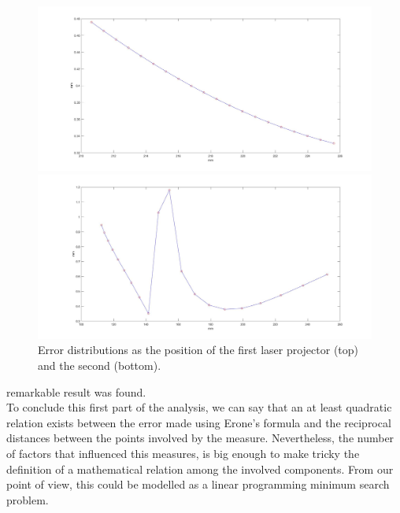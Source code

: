   \begin{figure}[t!]
    \centering
    \begin{minipage}[c]{0.9\textwidth}
      \centering
      \includegraphics[width=\textwidth]{./images/diameter/H1_1.jpg}
    \end{minipage}
    \vfill
    \begin{minipage}[c]{0.9\textwidth}
      \centering
      \includegraphics[width=\textwidth]{./images/diameter/H2_1.jpg}
    \end{minipage}
    
    \caption{Error distributions as the position of the first laser projector (top) and the second (bottom).}
    \label{fig:diam:hs}
  \end{figure}
  
\clearpage
\noindent
remarkable result was found. \\

To conclude this first part of the analysis, we can say that an at least quadratic relation exists between the error made using Erone's formula and the reciprocal distances between the points involved by the measure. Nevertheless, the number of factors that influenced this measures, is big enough to make tricky the definition of a mathematical relation among the involved components. From our point of view, this could be modelled as a linear programming minimum search problem. \\

